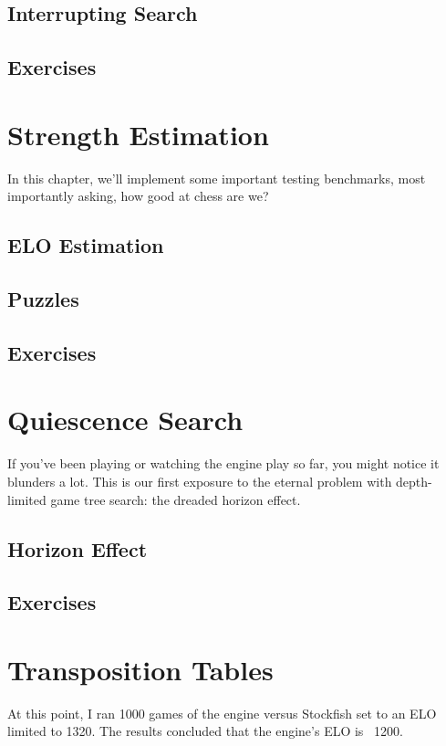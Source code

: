 \documentclass[letterpaper,11pt]{article}
\begin{document}
\subsection{Interrupting Search}
\subsection{Exercises}

\section{Strength Estimation}

In this chapter, we'll implement some important testing benchmarks, most importantly asking,
how good at chess are we?

\subsection{ELO Estimation}
\subsection{Puzzles}
\subsection{Exercises}

\section{Quiescence Search}

If you've been playing or watching the engine play so far, you might notice it blunders a lot. This is our first 
exposure to the eternal problem with depth-limited game tree search: the dreaded horizon effect.

\subsection{Horizon Effect}

\subsection{Exercises}

\section{Transposition Tables}

At this point, I ran 1000 games of the engine versus Stockfish set to an ELO limited to 1320. The results concluded that the engine's ELO is ~1200.
\end{document}
